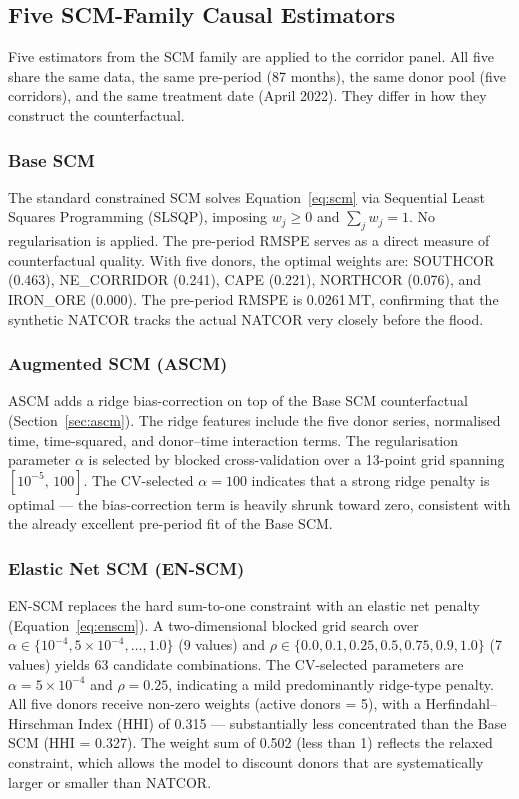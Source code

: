\subsection{Five SCM-Family Causal Estimators}
\label{sec:estimators}

Five estimators from the SCM family are applied to the corridor
panel.
All five share the same data, the same pre-period (87 months),
the same donor pool (five corridors), and the same treatment date
(April 2022).
They differ in how they construct the counterfactual.

\subsubsection{Base SCM}
\label{sec:base}

The standard constrained SCM solves Equation~\ref{eq:scm} via
Sequential Least Squares Programming (SLSQP), imposing
$w_j \geq 0$ and $\sum_j w_j = 1$.
No regularisation is applied.
The pre-period RMSPE serves as a direct measure of counterfactual
quality.
With five donors, the optimal weights are:
SOUTHCOR (0.463), NE\_CORRIDOR (0.241), CAPE (0.221),
NORTHCOR (0.076), and IRON\_ORE (0.000).
The pre-period RMSPE is 0.0261\,MT, confirming that the synthetic
NATCOR tracks the actual NATCOR very closely before the flood.

\subsubsection{Augmented SCM (ASCM)}
\label{sec:ascm_method}

ASCM adds a ridge bias-correction on top of the Base SCM
counterfactual (Section~\ref{sec:ascm}).
The ridge features include the five donor series, normalised time,
time-squared, and donor--time interaction terms.
The regularisation parameter $\alpha$ is selected by blocked
cross-validation over a 13-point grid spanning
$[10^{-5},\, 100]$.
The CV-selected $\alpha = 100$ indicates that a strong ridge penalty
is optimal --- the bias-correction term is heavily shrunk toward zero,
consistent with the already excellent pre-period fit of the Base SCM.

\subsubsection{Elastic Net SCM (EN-SCM)}
\label{sec:enscm_method}

EN-SCM replaces the hard sum-to-one constraint with an elastic net
penalty (Equation~\ref{eq:enscm}).
A two-dimensional blocked grid search over
$\alpha \in \{10^{-4}, 5\times10^{-4}, \ldots, 1.0\}$
(9 values) and
$\rho \in \{0.0, 0.1, 0.25, 0.5, 0.75, 0.9, 1.0\}$
(7 values) yields 63 candidate combinations.
The CV-selected parameters are $\alpha = 5\times10^{-4}$ and
$\rho = 0.25$, indicating a mild predominantly ridge-type penalty.
All five donors receive non-zero weights (active donors = 5),
with a Herfindahl--Hirschman Index (HHI) of 0.315 --- substantially
less concentrated than the Base SCM (HHI = 0.327).
The weight sum of 0.502 (less than 1) reflects the relaxed
constraint, which allows the model to discount donors that are
systematically larger or smaller than NATCOR.


